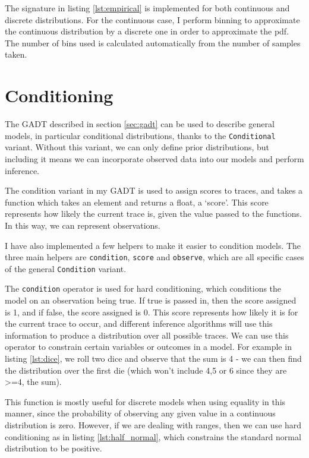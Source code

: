 The signature in listing \ref{lst:empirical} is implemented for both continuous and discrete distributions. For the continuous case, I perform binning to approximate the continuous distribution by a discrete one in order to approximate the pdf. The number of bins used is calculated automatically from the number of samples taken.
		
\section{Conditioning} \label{sec:condition}
	
The GADT described in section \ref{sec:gadt} can be used to describe general models, in particular conditional distributions, thanks to the \texttt{Conditional} variant. Without this variant, we can only define prior distributions, but including it means we can incorporate observed data into our models and perform inference.
	
The condition variant in my GADT is used to assign scores to traces, and takes a function which takes an element and returns a float, a `score'. This score represents how likely the current trace is, given the value passed to the functions. In this way, we can represent observations.
		
I have also implemented a few helpers to make it easier to condition models. The three main helpers are \texttt{condition}, \texttt{score} and \texttt{observe}, which are all specific cases of the general \texttt{Condition} variant. 
		
The \texttt{condition} operator is used for hard conditioning, which conditions the model on an observation being true. If true is passed in, then the score assigned is 1, and if false, the score assigned is 0. This score represents how likely it is for the current trace to occur, and different inference algorithms will use this information to produce a distribution over all possible traces. We can use this operator to constrain certain variables or outcomes in a model. For example in listing \ref{lst:dice}, we roll two dice and observe that the sum is 4 - we can then find the distribution over the first die (which won't include 4,5 or 6 since they are >=4, the sum).
						
This function is mostly useful for discrete models when using equality in this manner, since the probability of observing any given value in a continuous distribution is zero. However, if we are dealing with ranges, then we can use hard conditioning as in listing \ref{lst:half_normal}, which constrains the standard normal distribution to be positive.

